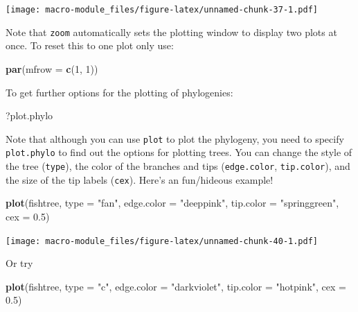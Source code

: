 \documentclass[]{book}
\newenvironment{Shaded}{\begin{snugshade}}{\end{snugshade}}
\newcommand{\KeywordTok}[1]{\textcolor[rgb]{0.13,0.29,0.53}{\textbf{{#1}}}}
\newcommand{\DataTypeTok}[1]{\textcolor[rgb]{0.13,0.29,0.53}{{#1}}}
\newcommand{\DecValTok}[1]{\textcolor[rgb]{0.00,0.00,0.81}{{#1}}}
\newcommand{\FloatTok}[1]{\textcolor[rgb]{0.00,0.00,0.81}{{#1}}}
\newcommand{\StringTok}[1]{\textcolor[rgb]{0.31,0.60,0.02}{{#1}}}
\newcommand{\NormalTok}[1]{{#1}}
\begin{document}
\texttt{[image: macro-module\_files/figure-latex/unnamed-chunk-37-1.pdf]}

Note that \texttt{zoom} automatically sets the plotting window to
display two plots at once. To reset this to one plot only use:

\begin{Shaded}
\begin{Highlighting}[]
\KeywordTok{par}\NormalTok{(}\DataTypeTok{mfrow =} \KeywordTok{c}\NormalTok{(}\DecValTok{1}\NormalTok{, }\DecValTok{1}\NormalTok{))}
\end{Highlighting}
\end{Shaded}

To get further options for the plotting of phylogenies:

\begin{Shaded}
\begin{Highlighting}[]
\NormalTok{?plot.phylo}
\end{Highlighting}
\end{Shaded}

Note that although you can use \texttt{plot} to plot the phylogeny, you
need to specify \texttt{plot.phylo} to find out the options for plotting
trees. You can change the style of the tree (\texttt{type}), the color
of the branches and tips (\texttt{edge.color}, \texttt{tip.color}), and
the size of the tip labels (\texttt{cex}). Here's an fun/hideous
example!

\begin{Shaded}
\begin{Highlighting}[]
\KeywordTok{plot}\NormalTok{(fishtree, }\DataTypeTok{type =} \StringTok{"fan"}\NormalTok{, }\DataTypeTok{edge.color =} \StringTok{"deeppink"}\NormalTok{, }\DataTypeTok{tip.color =} \StringTok{"springgreen"}\NormalTok{, }
     \DataTypeTok{cex =} \FloatTok{0.5}\NormalTok{)}
\end{Highlighting}
\end{Shaded}

\texttt{[image: macro-module\_files/figure-latex/unnamed-chunk-40-1.pdf]}

Or try

\begin{Shaded}
\begin{Highlighting}[]
\KeywordTok{plot}\NormalTok{(fishtree, }\DataTypeTok{type =} \StringTok{"c"}\NormalTok{, }\DataTypeTok{edge.color =} \StringTok{"darkviolet"}\NormalTok{, }\DataTypeTok{tip.color =} \StringTok{"hotpink"}\NormalTok{, }
     \DataTypeTok{cex =} \FloatTok{0.5}\NormalTok{)}
\end{Highlighting}
\end{Shaded}
\end{document}
